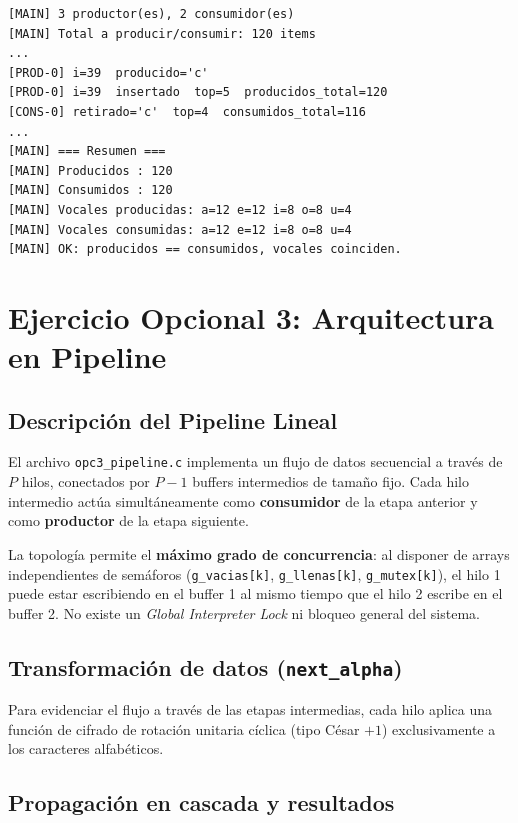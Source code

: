\documentclass[a4paper, 12pt]{article}
\newcommand{\ic}[1]{\texttt{#1}}
\begin{document}
\begin{lstlisting}[style=shellstyle]
[MAIN] 3 productor(es), 2 consumidor(es)
[MAIN] Total a producir/consumir: 120 items
...
[PROD-0] i=39  producido='c'
[PROD-0] i=39  insertado  top=5  producidos_total=120
[CONS-0] retirado='c'  top=4  consumidos_total=116
...
[MAIN] === Resumen ===
[MAIN] Producidos : 120
[MAIN] Consumidos : 120
[MAIN] Vocales producidas: a=12 e=12 i=8 o=8 u=4
[MAIN] Vocales consumidas: a=12 e=12 i=8 o=8 u=4
[MAIN] OK: producidos == consumidos, vocales coinciden.
\end{lstlisting}

\newpage

\section{Ejercicio Opcional 3: Arquitectura en Pipeline}



\subsection{Descripción del Pipeline Lineal}

El archivo \ic{opc3\_pipeline.c} implementa un flujo de datos secuencial a través de $P$ hilos, conectados por $P-1$ buffers intermedios de tamaño fijo. 
Cada hilo intermedio actúa simultáneamente como \textbf{consumidor} de la etapa anterior y como \textbf{productor} de la etapa siguiente. 

La topología permite el \textbf{máximo grado de concurrencia}: al disponer de arrays independientes de semáforos (\ic{g\_vacias[k]}, \ic{g\_llenas[k]}, \ic{g\_mutex[k]}), el hilo 1 puede estar escribiendo en el buffer 1 al mismo tiempo que el hilo 2 escribe en el buffer 2. No existe un \emph{Global Interpreter Lock} ni bloqueo general del sistema.

\subsection{Transformación de datos (\texttt{next\_alpha})}

Para evidenciar el flujo a través de las etapas intermedias, cada hilo aplica una función de cifrado de rotación unitaria cíclica (tipo César $+1$) exclusivamente a los caracteres alfabéticos.

\subsection{Propagación en cascada y resultados}
\end{document}
